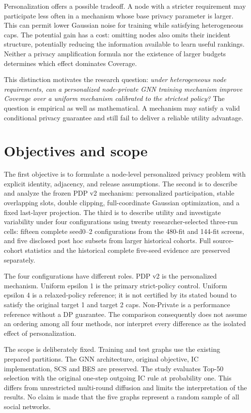 Personalization offers a possible tradeoff. A node with a stricter requirement may participate less often in a mechanism whose base privacy parameter is larger. This can permit lower Gaussian noise for training while satisfying heterogeneous caps. The potential gain has a cost: omitting nodes also omits their incident structure, potentially reducing the information available to learn useful rankings. Neither a privacy amplification formula nor the existence of larger budgets determines which effect dominates Coverage.

This distinction motivates the research question: \emph{under heterogeneous node requirements, can a personalized node-private GNN training mechanism improve Coverage over a uniform mechanism calibrated to the strictest policy?} The question is empirical as well as mathematical. A mechanism may satisfy a valid conditional privacy guarantee and still fail to deliver a reliable utility advantage.

\section{Objectives and scope}
The first objective is to formulate a node-level personalized privacy problem with explicit identity, adjacency, and release assumptions. The second is to describe and analyze the frozen PDP v2 mechanism: personalized participation, stable overlapping slots, double clipping, full-coordinate Gaussian optimization, and a fixed last-layer projection. The third is to describe utility and investigate variability under four configurations using twenty researcher-selected three-run cells: fifteen complete seed0--2 configurations from the 480-fit and 144-fit screens, and five disclosed post hoc subsets from larger historical cohorts. Full source-cohort statistics and the historical complete five-seed evidence are preserved separately.

The four configurations have different roles. PDP v2 is the personalized mechanism. Uniform epsilon 1 is the primary strict-policy control. Uniform epsilon 4 is a relaxed-policy reference; it is not certified by its stated bound to satisfy the original target 1 and target 2 caps. Non-Private is a performance reference without a DP guarantee. The comparison consequently does not assume an ordering among all four methods, nor interpret every difference as the isolated effect of personalization.

The scope is deliberately fixed. Training and test graphs use the existing prepared partitions. The GNN architecture, original objective, IC implementation, SCS and BES are preserved. The study evaluates Top-50 selection with the original one-step outgoing IC rule at probability one. This differs from unrestricted multi-round diffusion and limits the interpretation of the results. No claim is made that the five graphs represent a random sample of all social networks.

